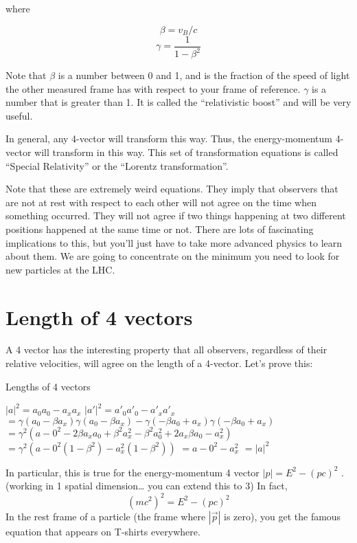 where

	\begin{equation} \beta = v_B /c \end{equation}   	
	 \begin{equation} \gamma = \frac{1}{1- \beta^2} \end{equation}  


Note that $\beta$  is a number between 0 and 1, and is the fraction of the speed of light the other measured frame has with respect to your frame of reference.  $\gamma$  is a number that is greater than 1.  It is called the “relativistic boost” and will be very useful.

In general, any 4-vector will transform this way.  Thus, the energy-momentum 4-vector will transform in this way.  This set of transformation equations is called “Special Relativity” or the “Lorentz transformation”.

Note that these are extremely weird equations.  They imply that observers that are not at rest with respect to each other will not agree on the time when something occurred. They will not agree if two things happening at two different positions happened at the same time or not.  There are lots of fascinating implications to this, but you’ll just have to take more advanced physics to learn about them.  We are going to concentrate on the minimum you need to look for new particles at the LHC.

\section{Length of 4 vectors}

A 4 vector has the interesting property that all observers, regardless of their relative velocities, will agree on the length of a 4-vector.  Let’s prove this:

Lengths of 4 vectors

$|a|^2 = a_0 a_0 - a_x a_x  $
$ |a'|^2 = a'_0 a'_0 - a'_x a'_x $ 
$ = \gamma (a_0 -\beta a_x) \gamma (a_0 -\beta a_x) - \gamma (-\beta a_0 +a_x ) \gamma (-\beta a_0 +a_x ) $
$= \gamma^2 (a-0^2  -2 \beta a_x a_0  + \beta^2 a_x^2 - \beta^2 a_0^2  + 2 a_x \beta  a_0  - a_x^2)  $
$=\gamma^2 ( a-0^2 (1-  \beta^2)  - a_x^2 (1-  \beta^2)) $ 
$= a-0^2 - a_x^2  $
$= |a|^2  $
 

In particular, this is true for the energy-momentum 4 vector  $|p| = E^2 - (pc)^2$  . (working in 1 spatial dimension… you can extend this to 3)  In fact, 
\begin{equation}
	  	(mc^2)^2 = E^2 -(pc)^2
\end{equation}  
In the rest frame of a particle (the frame where  $|\vec p |$  is zero), you get the famous equation that appears on T-shirts everywhere.


